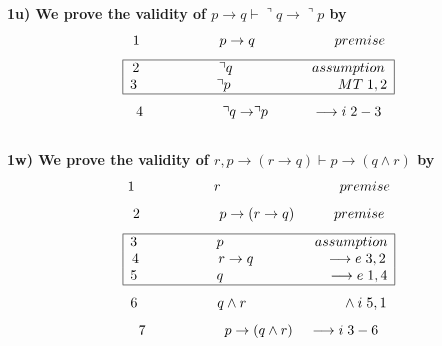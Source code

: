\documentclass[a4paper]{article}
\begin{document}
\textbf{{\large\hspace{1 cm} 1u) We prove the validity of $p \rightarrow q \vdash \urcorner q \rightarrow \urcorner p$ by}}
{\large $$1 \hspace{2 cm} p \rightarrow q \hspace{2 cm} premise$$ 
$$\begin{array}{|c|}
\hline 
\textcolor{black}{2 \hspace{2 cm} \urcorner q \hspace{2 cm} assumption}\\ 

\textcolor{black}{3 \hspace{2 cm} \urcorner p \hspace{2.7 cm} MT\hspace{0.1 cm} 1,2}\\ 
\hline
\end{array}$$ $$4 \hspace{2 cm} \urcorner q \rightarrow \urcorner p \hspace{1.1 cm} \longrightarrow i\hspace{0.1 cm} 2-3$$}\\

\textbf{{\large\hspace{1 cm} 1w) We prove the validity of $r,p \rightarrow (r \rightarrow q) \vdash p \rightarrow (q\wedge r)$ by}}
{\large $$1 \hspace{2 cm} r \hspace{3 cm} premise$$ $$2 \hspace{2 cm} p \rightarrow (r \rightarrow q) \hspace{1 cm} premise$$
$$\begin{array}{|c|}
\hline 
\textcolor{black}{3 \hspace{2 cm} p \hspace{2.3 cm} assumption}\\ 

\textcolor{black}{4 \hspace{2 cm} r \rightarrow q \hspace{1.8 cm} \longrightarrow e\hspace{0.1 cm} 3,2}\\ 

\textcolor{black}{5 \hspace{2 cm} q \hspace{2.6 cm} \longrightarrow e\hspace{0.1 cm} 1,4}\\ 
\hline
\end{array}$$ 
$$6 \hspace{2 cm}  q \wedge r \hspace{2.4 cm} \wedge i\hspace{0.1 cm} 5,1$$ $$7 \hspace{2 cm} p \rightarrow (q\wedge r) \hspace{0.4 cm} \longrightarrow i\hspace{0.1 cm} 3-6$$}\\
\end{document}
